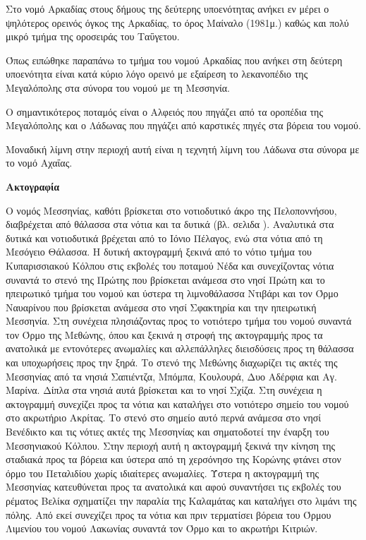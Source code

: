 \documentclass[12pt]{article}
\begin{document}
	Στο νομό Αρκαδίας στους δήμους της δεύτερης υποενότητας ανήκει εν μέρει ο ψηλότερος ορεινός όγκος της Αρκαδίας, το όρος Μαίναλο (1981μ.) καθώς και πολύ μικρό τμήμα της οροσειράς του Ταΰγετου.
	
	Όπως ειπώθηκε παραπάνω το τμήμα του νομού Αρκαδίας που ανήκει στη δεύτερη υποενότητα είναι κατά κύριο λόγο ορεινό με εξαίρεση το λεκανοπέδιο της Μεγαλόπολης στα σύνορα του νομού με τη Μεσσηνία.
	
	Ο σημαντικότερος ποταμός είναι ο Αλφειός που πηγάζει από τα οροπέδια της Μεγαλόπολης και ο Λάδωνας που πηγάζει από καρστικές πηγές στα βόρεια του νομού.
	
	Μοναδική λίμνη στην περιοχή αυτή είναι η τεχνητή λίμνη του Λάδωνα στα σύνορα με το νομό Αχαΐας.   
	
	\textbf{Ακτογραφία}
	
	Ο νομός Μεσσηνίας, καθότι βρίσκεται στο νοτιοδυτικό άκρο της Πελοποννήσου, διαβρέχεται από θάλασσα στα νότια και τα δυτικά (βλ. σελιδα \pageref{peloponnese}). Αναλυτικά στα δυτικά και νοτιοδυτικά βρέχεται από το Ιόνιο Πέλαγος, ενώ στα νότια από τη Μεσόγειο Θάλασσα. Η δυτική ακτογραμμή ξεκινά από το νότιο τμήμα του Κυπαρισσιακού Κόλπου στις εκβολές του ποταμού Νέδα και συνεχίζοντας νότια συναντά το στενό της Πρώτης που βρίσκεται ανάμεσα στο νησί Πρώτη και το ηπειρωτικό τμήμα του νομού και ύστερα τη λιμνοθάλασσα Ντιβάρι και τον Όρμο Ναυαρίνου που βρίσκεται ανάμεσα στο νησί Σφακτηρία και την ηπειρωτική Μεσσηνία. Στη συνέχεια πλησιάζοντας προς το νοτιότερο τμήμα του νομού συναντά τον Όρμο της Μεθώνης, όπου και ξεκινά η στροφή της ακτογραμμής προς τα ανατολικά με εντονότερες ανωμαλίες και αλλεπάλληλες διεισδύσεις προς τη θάλασσα και υποχωρήσεις προς την ξηρά. Το στενό της Μεθώνης διαχωρίζει τις ακτές της Μεσσηνίας από τα νησιά Σαπιέντζα, Μπόμπα, Κουλουρά, Δυο Αδέρφια και Αγ. Μαρίνα. Δίπλα στα νησιά αυτά βρίσκεται και το νησί Σχίζα. Στη συνέχεια η ακτογραμμή συνεχίζει προς τα νότια και καταλήγει στο νοτιότερο σημείο του νομού στο ακρωτήριο Ακρίτας. Το στενό στο σημείο αυτό περνά ανάμεσα στο νησί Βενέδικτο και τις νότιες ακτές της Μεσσηνίας και σηματοδοτεί την έναρξη του Μεσσηνιακού Κόλπου. Στην περιοχή αυτή η ακτογραμμή ξεκινά την κίνηση της σταδιακά προς τα βόρεια και ύστερα από τη χερσόνησο της Κορώνης φτάνει στον όρμο του Πεταλιδίου χωρίς ιδιαίτερες ανωμαλίες. Ύστερα η ακτογραμμή της Μεσσηνίας κατευθύνεται προς τα ανατολικά και αφού συναντήσει τις εκβολές του ρέματος Βελίκα σχηματίζει την παραλία της Καλαμάτας και καταλήγει στο λιμάνι της πόλης. Από εκεί συνεχίζει προς τα νότια και πριν τερματίσει βόρεια του Όρμου Λιμενίου του νομού Λακωνίας συναντά τον Όρμο και το ακρωτήρι Κιτριών.   
	
\end{document}
